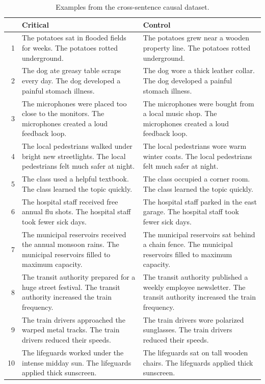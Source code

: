 \begin{table}[htbp]
\centering
\footnotesize
\setlength{\tabcolsep}{4pt}
\renewcommand{\arraystretch}{1.08}
\caption{Examples from the cross-sentence causal dataset.}
\label{tab:cross-sentence-examples}
\begin{tabular}{@{}r p{} p{}@{}}
\toprule
& Critical & Control \\
\midrule
1 & The potatoes sat in flooded fields for weeks. The potatoes rotted underground. & The potatoes grew near a wooden property line. The potatoes rotted underground. \\
2 & The dog ate greasy table scraps every day. The dog developed a painful stomach illness. & The dog wore a thick leather collar. The dog developed a painful stomach illness. \\
3 & The microphones were placed too close to the monitors. The microphones created a loud feedback loop. & The microphones were bought from a local music shop. The microphones created a loud feedback loop. \\
4 & The local pedestrians walked under bright new streetlights. The local pedestrians felt much safer at night. & The local pedestrians wore warm winter coats. The local pedestrians felt much safer at night. \\
5 & The class used a helpful textbook. The class learned the topic quickly. & The class occupied a corner room. The class learned the topic quickly. \\
6 & The hospital staff received free annual flu shots. The hospital staff took fewer sick days. & The hospital staff parked in the east garage. The hospital staff took fewer sick days. \\
7 & The municipal reservoirs received the annual monsoon rains. The municipal reservoirs filled to maximum capacity. & The municipal reservoirs sat behind a chain fence. The municipal reservoirs filled to maximum capacity. \\
8 & The transit authority prepared for a huge street festival. The transit authority increased the train frequency. & The transit authority published a weekly employee newsletter. The transit authority increased the train frequency. \\
9 & The train drivers approached the warped metal tracks. The train drivers reduced their speeds. & The train drivers wore polarized sunglasses. The train drivers reduced their speeds. \\
10 & The lifeguards worked under the intense midday sun. The lifeguards applied thick sunscreen. & The lifeguards sat on tall wooden chairs. The lifeguards applied thick sunscreen. \\
\bottomrule
\end{tabular}
\end{table}

